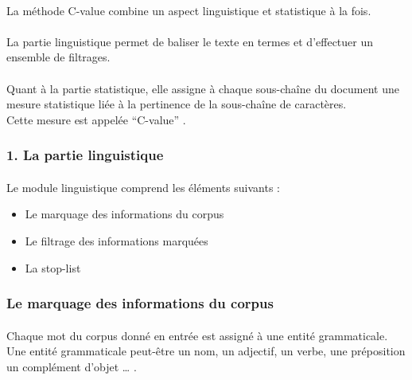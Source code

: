 \documentclass[12pt, a4paper, oneside]{book}
\begin{document}
\paragraph{}
La méthode C-value combine un aspect linguistique et statistique à la fois.
\paragraph{}
La partie linguistique permet de baliser le texte en termes et d'effectuer un ensemble de filtrages. 
\paragraph{}
Quant à la partie statistique, elle assigne à chaque sous-chaîne du document une mesure statistique liée à la pertinence de la sous-chaîne de caractères.\\
Cette mesure est appelée “C-value” \cite{cvalue}.

\subsubsection{1. La partie linguistique}
\paragraph{}
Le module linguistique comprend les éléments suivants : \\
\begin{itemize}
\item Le marquage des informations du corpus\\
\item Le filtrage des informations marquées\\
\item La stop-list\\

\end{itemize}


\subsubsection{Le marquage des informations du corpus}
\paragraph{}
Chaque mot du corpus donné en entrée est assigné à une entité grammaticale.\\
Une entité grammaticale peut-être un nom, un adjectif, un verbe, une préposition un complément d'objet … .
\end{document}
